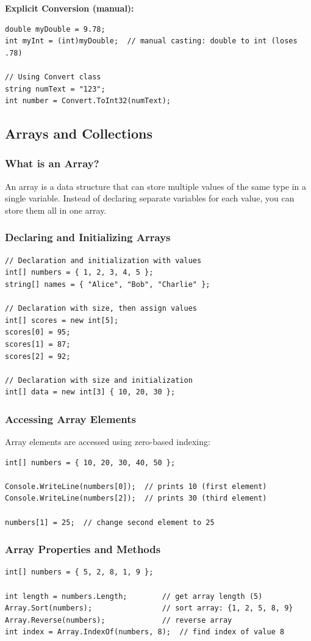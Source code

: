 \documentclass{article}
\begin{document}
\textbf{Explicit Conversion (manual):}
\begin{verbatim}
double myDouble = 9.78;
int myInt = (int)myDouble;  // manual casting: double to int (loses .78)

// Using Convert class
string numText = "123";
int number = Convert.ToInt32(numText);
\end{verbatim}

\subsection{Arrays and Collections}

\subsubsection{What is an Array?}
An array is a data structure that can store multiple values of the same type in a single variable. Instead of declaring separate variables for each value, you can store them all in one array.

\subsubsection{Declaring and Initializing Arrays}
\begin{verbatim}
// Declaration and initialization with values
int[] numbers = { 1, 2, 3, 4, 5 };
string[] names = { "Alice", "Bob", "Charlie" };

// Declaration with size, then assign values
int[] scores = new int[5];
scores[0] = 95;
scores[1] = 87;
scores[2] = 92;

// Declaration with size and initialization
int[] data = new int[3] { 10, 20, 30 };
\end{verbatim}

\subsubsection{Accessing Array Elements}
Array elements are accessed using zero-based indexing:
\begin{verbatim}
int[] numbers = { 10, 20, 30, 40, 50 };

Console.WriteLine(numbers[0]);  // prints 10 (first element)
Console.WriteLine(numbers[2]);  // prints 30 (third element)

numbers[1] = 25;  // change second element to 25
\end{verbatim}

\subsubsection{Array Properties and Methods}
\begin{verbatim}
int[] numbers = { 5, 2, 8, 1, 9 };

int length = numbers.Length;        // get array length (5)
Array.Sort(numbers);                // sort array: {1, 2, 5, 8, 9}
Array.Reverse(numbers);             // reverse array
int index = Array.IndexOf(numbers, 8);  // find index of value 8
\end{verbatim}
\end{document}
